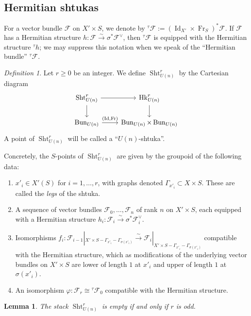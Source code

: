 \documentclass[reqno]{amsart}
\numberwithin{equation}{section}
\newcommand{\Cal}[1]{\mathcal{#1}}
\newcommand{\ft}{{}^{\tau}}
\newcommand{\co}{\colon}
\DeclareMathOperator{\Frob}{Fr}
\DeclareMathOperator{\Bun}{Bun}
\DeclareMathOperator{\Id}{Id}
\DeclareMathOperator{\Sht}{Sht}
\DeclareMathOperator{\Hk}{Hk}
\newcommand{\s}{\sigma}
\newtheorem{lemma}[thm]{Lemma}
\theoremstyle{remark}
\newtheorem{defn}[thm]{Definition}
\numberwithin{equation}{section}
\begin{document}
\subsection{Hermitian shtukas}
For a vector bundle $\Cal{F}$ on $X' \times S$, we denote by $\ft \Cal{F} := (\Id_{X'} \times \Frob_S)^* \Cal{F}$. If $\Cal{F}$ has a Hermitian structure $h \co \Cal{F} \xrightarrow{\sim} \sigma^* \Cal{F}^{\vee}$, then $\ft \Cal{F}$ is equipped with the Hermitian structure $\ft h$; we may suppress this notation when we speak of the ``Hermitian bundle'' $\ft \Cal{F}$. 

\begin{defn}
Let $r \geq 0$ be an integer. We define $\Sht_{U(n)}^{r}$ by the Cartesian diagram
\[
\begin{tikzcd}
\Sht_{U(n)}^{r} \ar[r] \ar[d] & \Hk_{U(n)}^{r} \ar[d] \\
\Bun_{U(n)} \ar[r, "{(\Id, \Frob})"]  & \Bun_{U(n)} \times \Bun_{U(n)}
\end{tikzcd}
\]
A point of $\Sht_{U(n)}^{r}$ will be called a ``$U(n)$-shtuka''. 

Concretely, the $S$-points of $\Sht_{U(n)}^{r}$ are given by the groupoid of the following data: 
\begin{enumerate}
\item $x'_i \in X'(S)$ for $i = 1, \ldots, r$, with graphs denoted $\Gamma_{x'_i} \subset X \times S$. These are called the \emph{legs} of the shtuka. 
\item A sequence of vector bundles $\Cal{F}_0, \ldots, \Cal{F}_n$ of rank $n$ on $X' \times S$, each equipped with a Hermitian structure $h_i \co \Cal{F}_i \xrightarrow{\sim} \sigma^* \Cal{F}_i^{\vee}$. 
\item Isomorphisms $f_i \co \Cal{F}_{i-1}|_{X' \times S - \Gamma_{x'_i} - \Gamma_{\s(x'_i)}} \xrightarrow{\sim} \Cal{F}_i|_{X' \times S - \Gamma_{x'_i}-\Gamma_{\s(x'_i)}}$ compatible with the Hermitian structure, which as modifications of the underlying vector bundles on $X' \times S$ are lower of length $1$ at $x'_i$ and upper of length $1$ at $\sigma(x'_i)$. 

\item An isomorphism $\varphi \co \Cal{F}_r \cong \ft \Cal{F}_0$ compatible with the Hermitian structure. 
\end{enumerate}
\end{defn}


\begin{lemma}\label{lem: shtuka empty parity} The stack $\Sht_{U(n)}^r$ is empty if and only if $r$ is odd. 
\end{lemma}
\end{document}
